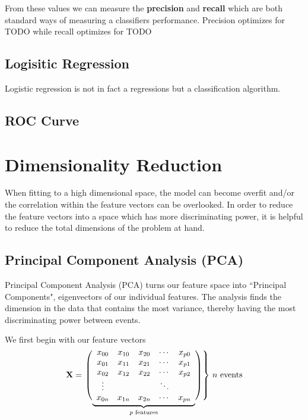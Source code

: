 From these values we can measure the \textbf{precision} and \textbf{recall} which are both standard ways of measuring a classifiers performance. Precision optimizes for TODO while recall optimizes for TODO

\subsection{Logisitic Regression}
Logistic regression is not in fact a regressions but a classification algorithm.

\subsection{ROC Curve}


\section{Dimensionality Reduction}\label{dim_red}
When fitting to a high dimensional space, the model can become overfit and/or the correlation within the feature vectors can be overlooked. In order to reduce the feature vectors into a space which has more discriminating power, it is helpful to reduce the total dimensions of the problem at hand.
\subsection{Principal Component Analysis (PCA)}
Principal Component Analysis (PCA) turns our feature space into ``Principal Components", eigenvectors of our individual features. The analysis finds the dimension in the data that contains the most variance, thereby having the most discriminating power between events.

We first begin with our feature vectors
$$\mathbf{X} = \left.\left( 
                  \vphantom{\begin{array}{c}1\\1\\1\\1\\1\end{array}}
                  \smash{\underbrace{
                      \begin{array}{ccccc}
                             x_{00}&x_{10}&x_{20}&\cdots &x_{p0}\\
                             x_{01}&x_{11}&x_{21}&\cdots &x_{p1}\\
                             x_{02}&x_{12}&x_{22}&\cdots &x_{p2}\\
                             \vdots&&&\ddots&\\
                             x_{0n}&x_{1n}&x_{2n}&\cdots &x_{pn}
                      \end{array}
                      }_{p\text{ features}}}
              \right)\right\}
              \,n\text{ events}
$$\\

